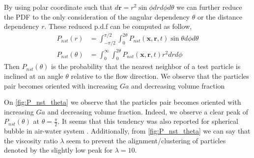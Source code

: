 By using polar coordinate such that $d \textbf{r} = r^2 \sin \phi dr d\phi d\theta$ we can further reduce the PDF to the only consideration of the angular dependency $\theta$ or the distance dependency $r$. 
These reduced p.d.f can be computed as follow, 
\begin{align*}
    P_{nst}(r) 
    &= \int_{-\pi/2}^{\pi/2}\int_{0}^{2\theta} P_{nst}(\textbf{x},\textbf{r},t) \sin \theta  d\phi d\theta\\
    P_{nst}(\theta)
    &= \int_{0}^{\infty}\int_{0}^{2\theta} P_{nst}(\textbf{x},\textbf{r},t) r^2  dr d\phi
\end{align*}
Then $P_{nst}(\theta)$ is the probability that the nearest neighbor of a test particle is inclined at an angle $\theta$ relative to the flow direction. 
We observe that the particles pair becomes oriented with increasing $Ga$ and decreasing volume fraction

On \ref{fig:P_nst_theta} we observe that the particles pair becomes oriented with increasing $Ga$ and decreasing volume fraction.
Indeed, we observe a clear peak of $P_{nst}(\theta)$ at $\theta = \frac{\pi}{2}$. 
It seems that this tendency was also reported for spherical bubble in air-water system \citet{bunner2003effect}. 
Additionally, from \ref{fig:P_nst_theta} we can say that the viscosity ratio $\lambda$ seem to prevent the alignment/clustering of particles denoted by the slightly low peak for $\lambda =10$. 

